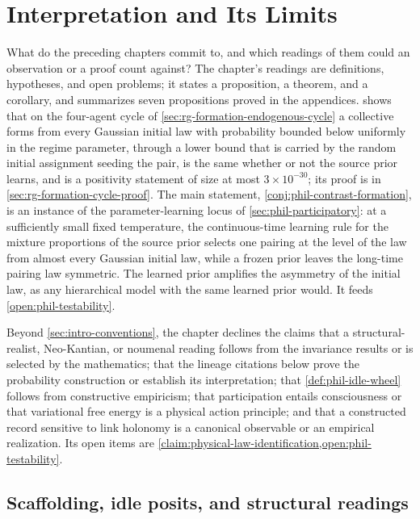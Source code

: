 \chapter{Interpretation and Its Limits}
\label{ch:philosophy}

What do the preceding chapters commit to, and which readings of them could an
observation or a proof count against? The chapter's readings are definitions,
hypotheses, and open problems; it states a proposition, a theorem, and a
corollary, and summarizes seven propositions proved in the appendices.
 shows that on the four-agent cycle
of \cref{sec:rg-formation-endogenous-cycle} a collective forms from every
Gaussian initial law with probability bounded below uniformly in the regime
parameter, through a lower bound that is carried by the random initial
assignment seeding the pair, is the same whether or not the source prior
learns, and is a positivity statement of size at most \(3\times10^{-30}\); its proof is in
\cref{sec:rg-formation-cycle-proof}. The main statement,
\cref{conj:phil-contrast-formation}, is an instance of the parameter-learning
locus of \cref{sec:phil-participatory}: at a sufficiently small fixed
temperature, the continuous-time learning rule for the mixture proportions of
the source prior selects one pairing at the level of the law from almost every
Gaussian initial law, while a frozen prior leaves the long-time pairing law
symmetric. The learned prior amplifies the asymmetry of the initial law, as
any hierarchical model with the same learned prior would. It feeds
\cref{open:phil-testability}.

Beyond \cref{sec:intro-conventions}, the chapter declines the claims that a
structural-realist, Neo-Kantian, or noumenal reading follows from the invariance
results or is selected by the mathematics; that the lineage citations below
prove the probability construction or establish its interpretation; that
\cref{def:phil-idle-wheel} follows from constructive empiricism; that
participation entails consciousness or that variational free energy is a
physical action principle; and that a constructed record sensitive to link
holonomy is a canonical observable or an empirical realization. Its open items
are \cref{claim:physical-law-identification,open:phil-testability}.

\section{Scaffolding, idle posits, and structural readings}
\label{sec:phil-base}
\label{sec:phil-noumenon}
\label{sec:phil-realism}

